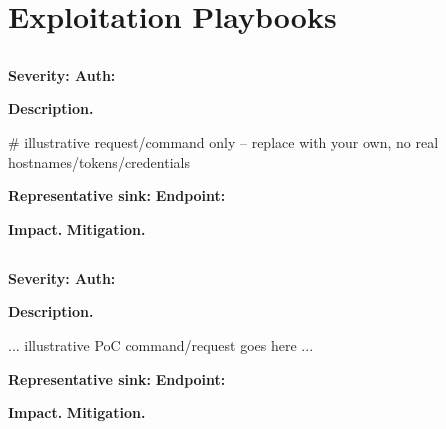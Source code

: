 \section{Exploitation Playbooks}\label{sec:playbooks}
\subsection{}
\textbf{Severity: \critical\quad Auth: }

\textbf{Description.} 
\begin{codebox}
# illustrative request/command only -- replace with your own, no real hostnames/tokens/credentials
\end{codebox}
\noindent\textbf{Representative sink:} \quad\textbf{Endpoint:} 

\textbf{Impact.}  \textbf{Mitigation.} 

\subsection{}
\textbf{Severity: \fillme{\high}\quad Auth: }

\textbf{Description.} 
\begin{codebox}
... illustrative PoC command/request goes here ...
\end{codebox}
\noindent\textbf{Representative sink:} \quad\textbf{Endpoint:} 

\textbf{Impact.}  \textbf{Mitigation.} 
